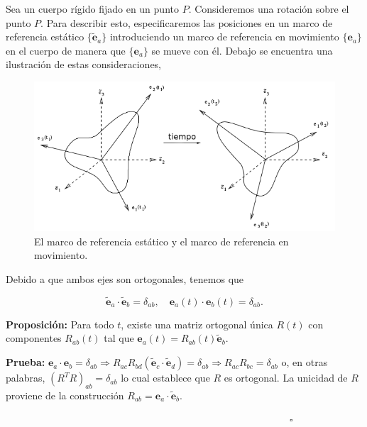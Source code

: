 \documentclass[a4paper,10pt]{article}
\numberwithin{equation}{section}
\newcommand{\prueba}{\textbf{Prueba: }}
\newcommand{\proposicion}{\textbf{Proposición: }}
\begin{document}
\vspace{.3cm}

Sea un cuerpo rígido fijado en un punto $P$. Consideremos una rotación sobre el punto 
$P$. Para describir esto, especificaremos las posiciones en un marco de referencia 
estático $\{{\tilde{\mathbf{e}}_a\}}$ introduciendo un marco de referencia en movimiento $\{{\mathbf{e}_a}\}$
en el cuerpo de manera que $\{\mathbf{e}_a\}$ se mueve con él. Debajo se encuentra una 
ilustración de estas consideraciones,

\begin{figure}[H]
 \center 
 \includegraphics[scale=0.6]{problema5fig1}
 \caption{El marco de referencia estático y el marco de referencia en movimiento.}
\end{figure}

Debido a que ambos ejes son ortogonales, tenemos que 

\begin{equation}
 \tilde{\mathbf{e}}_a \cdot \tilde{\mathbf{e}}_b = \delta_{ab}, \quad \mathbf{e}_a(t) \cdot \mathbf{e}_b(t) = \delta_{ab}.
\end{equation}

\proposicion Para todo $t$, existe una matriz ortogonal única $R(t)$ con componentes 
$R_{ab}(t)$ tal que $\mathbf{e}_a(t) = R_{ab}(t)\tilde{\mathbf{e}}_b$.

\vspace{.3cm}

\prueba $\mathbf{e}_a \cdot \mathbf{e}_b = \delta_{ab} \Rightarrow R_{ac}R_{bd} 
(\tilde{\mathbf{e}}_c\cdot\tilde{\mathbf{e}}_d) = \delta_{ab} \Rightarrow R_{ac}R_{bc} = 
\delta_{ab}$ o, en otras palabras, $(R^TR)_{ab} = \delta_{ab}$ lo cual establece que 
$R$ es ortogonal. La unicidad de $R$ proviene de la construcción $R_{ab} = \mathbf{e}_a \cdot 
\tilde{\mathbf{e}}_b$.

$\hspace{12cm} \square$
\end{document}
